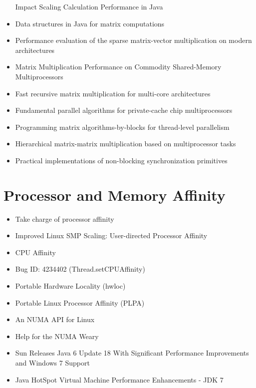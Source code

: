 \begin{itemize}
  Impact Scaling Calculation Performance in Java \cite{Kim2010}
\item Data structures in Java for matrix computations
  \cite{Gundersen2004}
\item Performance evaluation of the sparse matrix-vector
  multiplication on modern architectures \cite{Goumas2009}
\item Matrix Multiplication Performance on Commodity Shared-Memory
  Multiprocessors \cite{Tsilikas2004}
\item Fast recursive matrix multiplication for multi-core
  architectures \cite{Runger2010}
\item Fundamental parallel algorithms for private-cache chip
  multiprocessors \cite{Arge2008}
\item Programming matrix algorithms-by-blocks for thread-level
  parallelism \cite{Quintana-Orti2009}
\item Hierarchical matrix-matrix multiplication based on
  multiprocessor tasks \cite{Hunold2004}
\item Practical implementations of non-blocking synchronization
  primitives \cite{Moir1997}
\end{itemize}


\section*{Processor and Memory Affinity}
\label{sec:lr-processor-and-memory-affinity}

\begin{itemize}
\item[\checkmark] Take charge of processor affinity \cite{Dow2005}
\item[\checkmark] Improved Linux SMP Scaling: User-directed Processor Affinity
  \cite{Foong2008}
\item[\checkmark] CPU Affinity \cite{Love2003}
\item[\checkmark] Bug ID: 4234402 (Thread.setCPUAffinity)
  \cite{Oracle1999}
\item[\checkmark] Portable Hardware Locality (hwloc)
  \cite{OpenMPI2010}
\item[\checkmark] Portable Linux Processor Affinity (PLPA)
  \cite{OpenMPI2010a}
\item[\checkmark] An NUMA API for Linux \cite{Kleen2004}
\item[\checkmark] Help for the NUMA Weary \cite{Masamitsu2008}
\item[\checkmark] Sun Releases Java 6 Update 18 With Significant
  Performance Improvements and Windows 7 Support \cite{Humble2010}
\item[\checkmark] Java HotSpot Virtual Machine Performance
  Enhancements - JDK 7 \cite{Oracle2010}
\end{itemize}


